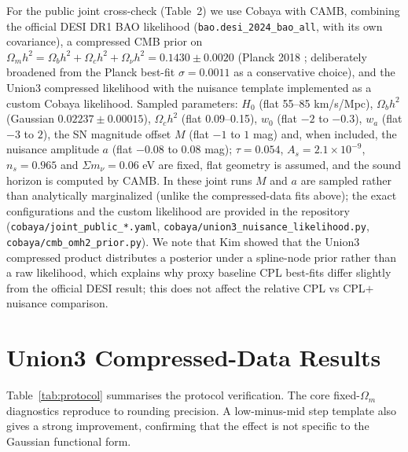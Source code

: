\documentclass[11pt]{article}
\begin{document}
For the public joint cross-check (Table~2) we use Cobaya with CAMB, combining the
official DESI DR1 BAO likelihood (\texttt{bao.desi\_2024\_bao\_all}, with its own
covariance), a compressed CMB prior on
$\Omega_m h^2=\Omega_b h^2+\Omega_c h^2+\Omega_\nu h^2=0.1430\pm0.0020$
(Planck 2018 \cite{planck2018}; deliberately broadened from the Planck best-fit
$\sigma=0.0011$ as a conservative choice), and the Union3 compressed likelihood with
the nuisance template implemented as a custom Cobaya likelihood. Sampled parameters:
$H_0$ (flat 55--85 km/s/Mpc), $\Omega_b h^2$ (Gaussian $0.02237\pm0.00015$),
$\Omega_c h^2$ (flat 0.09--0.15), $w_0$ (flat $-2$ to $-0.3$), $w_a$ (flat $-3$ to
$2$), the SN magnitude offset $M$ (flat $-1$ to $1$ mag) and, when included, the
nuisance amplitude $a$ (flat $-0.08$ to $0.08$ mag); $\tau=0.054$,
$A_s=2.1\times10^{-9}$, $n_s=0.965$ and $\Sigma m_\nu=0.06$ eV are fixed, flat
geometry is assumed, and the sound horizon is computed by CAMB. In these joint runs
$M$ and $a$ are sampled rather than analytically marginalized (unlike the
compressed-data fits above); the exact configurations and the custom likelihood are
provided in the repository (\texttt{cobaya/joint\_public\_*.yaml},
\texttt{cobaya/union3\_nuisance\_likelihood.py}, \texttt{cobaya/cmb\_omh2\_prior.py}). We note that Kim \cite{kim2024}
showed that the Union3 compressed product distributes a posterior under a spline-node
prior rather than a raw likelihood, which explains why proxy baseline CPL best-fits
differ slightly from the official DESI result; this does not affect the relative CPL
vs CPL$+$nuisance comparison.

\section{Union3 Compressed-Data Results}

Table~\ref{tab:protocol} summarises the protocol verification. The core fixed-$\Omega_m$
diagnostics reproduce to rounding precision. A low-minus-mid step template also gives a
strong improvement, confirming that the effect is not specific to the Gaussian
functional form.
\end{document}
